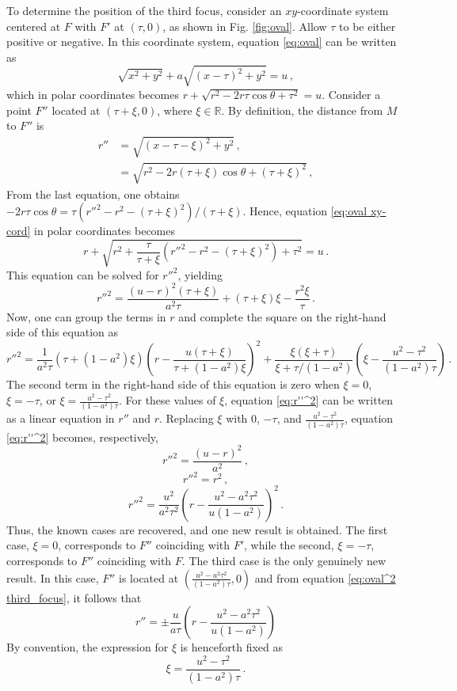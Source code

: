 \documentclass[12pt, ams, nofootinbib]{revtex4}
\def\be{\begin{equation}}
\def\ee{\end{equation}}
\newcommand{\rob}[1]{\left(#1\right)}    %
\renewcommand{\Re}{\mathbb{R}}           %
\theoremstyle{definition}
\begin{document}
To determine the position of the third focus, consider an $xy$-coordinate system centered at $F$ with $F'$ at $(\tau,0)$, as shown in Fig. \ref{fig:oval}. Allow $\tau$ to be either positive or negative. In this coordinate system, equation \ref{eq:oval} can be written as 
\be
	\sqrt{x^2+y^2}+a \sqrt{(x-\tau)^2+y^2}=u\,, \label{eq:oval xy-cord}
\ee
which in polar coordinates becomes $r+\sqrt{r^2-2r\tau\cos\theta+\tau^2}=u$. Consider a point $F''$ located at $(\tau+\xi,0)$, where $\xi\in\Re$. By definition, the distance from $M$ to $F''$ is
\begin{align}
	r'' &= \sqrt{(x-\tau-\xi)^2+y^2}\,, \\
		&= \sqrt{r^2-2r(\tau+\xi)\cos\theta+(\tau+\xi)^2}\,,
\end{align}
From the last equation, one obtains $-2r\tau\cos\theta=\tau(r''^2-r^2-(\tau+\xi)^2)/(\tau+\xi)$. Hence, equation \ref{eq:oval xy-cord} in polar coordinates becomes
\be
	r+\sqrt{r^2+\frac{\tau}{\tau+\xi}(r''^2-r^2-(\tau+\xi)^2)+\tau^2}=u\,.
\ee
This equation can be solved for $r''^2$, yielding
\be
	r''^2 = \frac{(u-r)^2(\tau+\xi)}{a^2\tau}+(\tau+\xi)\xi -\frac{r^2\xi}{\tau}\,.
\ee
Now, one can group the terms in $r$ and complete the square on the right-hand side of this equation as
\be
	r''^2=\frac{1}{a^2\tau}\left(\tau+(1-a^2)\xi\right)\left(r-\frac{u(\tau+\xi)}{\tau+(1-a^2)\xi}\right)^2 + \frac{\xi(\xi+\tau)}{\xi+\tau/(1-a^2)}\left(\xi-\frac{u^2-\tau^2}{(1-a^2)\tau}\right)\,. \label{eq:r''^2}
\ee
The second term in the right-hand side of this equation is zero when $\xi=0$, $\xi=-\tau$, or $\xi=\frac{u^2-\tau^2}{(1-a^2)\tau}$. For these values of $\xi$, equation \ref{eq:r''^2} can be written as a linear equation in $r''$ and $r$. Replacing $\xi$ with $0$, $-\tau$, and $\frac{u^2-\tau^2}{(1-a^2)\tau}$, equation \ref{eq:r''^2} becomes, respectively,
\be
	r''^2 = \frac{(u-r)^2}{a^2}\,,
\ee
\be
	r''^2 = r^2\,,
\ee
\be
	r''^2 = \frac{u^2}{a^2\tau^2}\rob{r-\frac{u^2-a^2\tau^2}{u(1-a^2)}}^2\,. \label{eq:oval^2 third_focus}
\ee
Thus, the known cases are recovered, and one new result is obtained. The first case, $\xi=0$, corresponds to $F''$ coinciding with $F'$, while the second, $\xi=-\tau$, corresponds to $F''$ coinciding with $F$. The third case is the only genuinely new result. In this case, $F''$ is located at $(\frac{u^2-a^2\tau^2}{(1-a^2)\tau},0)$ and from equation \ref{eq:oval^2 third_focus}, it follows that
\be
	r'' = \pm \frac{u}{a\tau}\rob{r-\frac{u^2-a^2\tau^2}{u(1-a^2)}} \label{eq:oval^2 third_focus_2}
\ee
 By convention, the expression for $\xi$ is henceforth fixed as
\be
	\xi = \frac{u^2-\tau^2}{(1-a^2)\tau}\,. \label{eq:def xi}
\ee
\end{document}
